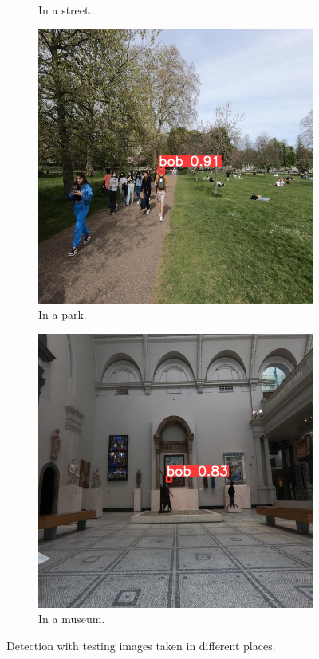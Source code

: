 \documentclass[10pt,conference,compsocconf]{IEEEtran}
\begin{document}
\begin{figure}
\begin{subfigure}{0.23\textwidth}
    \caption{In a street.}
  \end{subfigure}
  \hfil
  \begin{subfigure}{0.23\textwidth}
    \includegraphics[width=\linewidth]{Image/bob10.jpg}
    \caption{In a park.}
  \end{subfigure}
  \hfil
  \begin{subfigure}{0.23\textwidth}
    \includegraphics[width=\linewidth]{Image/bob7.jpg}
    \caption{In a museum.}
    \label{fig:Hard}
  \end{subfigure}
  \caption{Detection with testing images taken in different places.}
  \label{det}
\end{figure}
\end{document}
